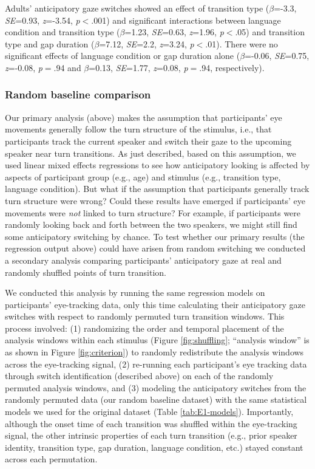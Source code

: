 \documentclass[authoryear, 12pt]{elsarticle}
\begin{document}
Adults' anticipatory gaze switches showed an effect of transition type (\textit{$\beta$}=-3.3, \textit{SE}=0.93, \textit{z}=-3.54, \textit{p}$<$.001) and significant interactions between language condition and transition type (\textit{$\beta$}=1.23, \textit{SE}=0.63, \textit{z}=1.96, \textit{p}$<$.05) and transition type and gap duration (\textit{$\beta$}=7.12, \textit{SE}=2.2, \textit{z}=3.24, \textit{p}$<$.01). There were no significant effects of language condition or gap duration alone (\textit{$\beta$}=-0.06, \textit{SE}=0.75, \textit{z}=-0.08, \textit{p}$=$.94 and \textit{$\beta$}=0.13, \textit{SE}=1.77, \textit{z}=0.08, \textit{p}$=$.94, respectively).


\subsubsection*{Random baseline comparison}
\label{sec:randbaseline1}

Our primary analysis (above) makes the assumption that participants' eye movements generally follow the turn structure of the stimulus, i.e., that participants track the current speaker and switch their gaze to the upcoming speaker near turn transitions. As just described, based on this assumption, we used linear mixed effects regressions to see how anticipatory looking is affected by aspects of participant group (e.g., age) and stimulus (e.g., transition type, language condition). But what if the assumption that participants generally track turn structure were wrong? Could these results have emerged if participants' eye movements were \textit{not} linked to turn structure? For example, if participants were randomly looking back and forth between the two speakers, we might still find some anticipatory switching by chance. To test whether our primary results (the regression output above) could have arisen from random switching we conducted a secondary analysis comparing participants' anticipatory gaze at real and randomly shuffled points of turn transition.

We conducted this analysis by running the same regression models on participants' eye-tracking data, only this time calculating their anticipatory gaze switches with respect to randomly permuted turn transition windows. This process involved: (1) randomizing the order and temporal placement of the analysis windows within each stimulus (Figure \ref{fig:shuffling}; ``analysis window'' is as shown in Figure \ref{fig:criterion}) to randomly redistribute the analysis windows across the eye-tracking signal, (2) re-running each participant's eye tracking data through switch identification (described above) on each of the randomly permuted analysis windows, and (3) modeling the anticipatory switches from the randomly permuted data (our random baseline dataset) with the same statistical models we used for the original dataset (Table \ref{tab:E1-models}). Importantly, although the onset time of each transition was shuffled within the eye-tracking signal, the other intrinsic properties of each turn transition (e.g., prior speaker identity, transition type, gap duration, language condition, etc.) stayed constant across each permutation.
\end{document}
